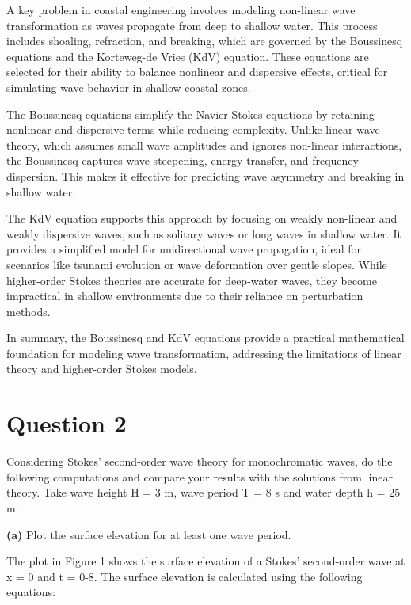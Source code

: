 \documentclass[a4paper]{article}
\begin{document}
A key problem in coastal engineering involves modeling non-linear wave transformation as waves propagate from deep to shallow water. This process includes shoaling, refraction, and breaking, which are governed by the Boussinesq equations and the Korteweg-de Vries (KdV) equation. These equations are selected for their ability to balance nonlinear and dispersive effects, critical for simulating wave behavior in shallow coastal zones.

The Boussinesq equations simplify the Navier-Stokes equations by retaining nonlinear and dispersive terms while reducing complexity. Unlike linear wave theory, which assumes small wave amplitudes and ignores non-linear interactions, the Boussinesq captures wave steepening, energy transfer, and frequency dispersion. This makes it effective for predicting wave asymmetry and breaking in shallow water.

The KdV equation supports this approach by focusing on weakly non-linear and weakly dispersive waves, such as solitary waves or long waves in shallow water. It provides a simplified model for unidirectional wave propagation, ideal for scenarios like tsunami evolution or wave deformation over gentle slopes. While higher-order Stokes theories are accurate for deep-water waves, they become impractical in shallow environments due to their reliance on perturbation methods.

In summary, the Boussinesq and KdV equations provide a practical mathematical foundation for modeling wave transformation, addressing the limitations of linear theory and higher-order Stokes models. 

\vspace{0.5cm}
\section{Question 2} Considering Stokes’ second-order wave theory for monochromatic waves, do the following computations and compare your results with the solutions from linear theory. Take wave height H = 3 m, wave period T = 8 s and water depth h = 25 m.
\vspace{0.3cm}

\noindent\textbf{(a)} Plot the surface elevation for at least one wave period.
\vspace{0.2cm}

The plot in Figure 1 shows the surface elevation of a Stokes' second-order wave at x = 0 and t = 0-8. The surface elevation is calculated using the following equations:
\end{document}
